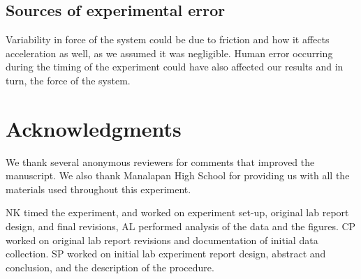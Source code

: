 ﻿\documentclass[reprint,amsmath,amssymb.aps]{revtex4-2}
\begin{document}
\subsection{Sources of experimental error}
Variability in force of the system could be due to friction and how it affects acceleration as well, as we assumed it was negligible. Human error occurring during the timing of the experiment could have also affected our results and in turn, the force of the system. 

\section{Acknowledgments}
We thank several anonymous reviewers for comments that improved the manuscript. We also thank Manalapan High School for providing us with all the materials used throughout this experiment. 

NK timed the experiment, and worked on experiment set-up, original lab report design, and final revisions, AL performed analysis of the data and the figures. CP worked on original lab report revisions and documentation of initial data collection. SP worked on initial lab experiment report design, abstract and conclusion, and the description of the procedure. 






\end{document}
